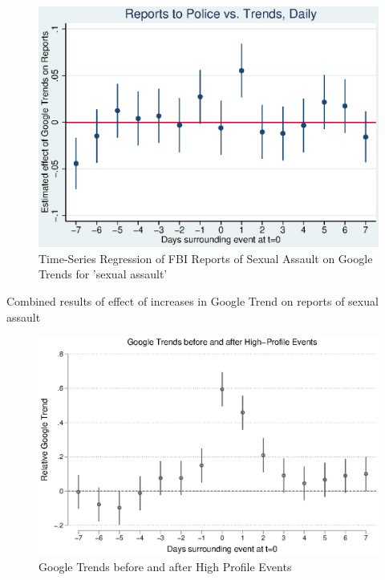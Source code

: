 \documentclass[AER,draftmode]{AEA}
\begin{document}
\begin{figure}
\includegraphics[width=\linewidth]{figures/police_trend_daily_logboth.eps}
\caption{Time-Series Regression of FBI Reports of Sexual Assault on Google Trends for 'sexual assault'} \label{figure:police_trends_daily_logboth}
\end{figure}

\begin{table}[]
\caption{Combined results of effect of increases in Google Trend on reports of sexual assault} \label{table:combinedtable}

\end{table}

\begin{figure}
\includegraphics[width=\linewidth]{figures/events_trend.eps}
\caption{Google Trends before and after High Profile Events} \label{figure:events_trend}
\end{figure}
\end{document}
